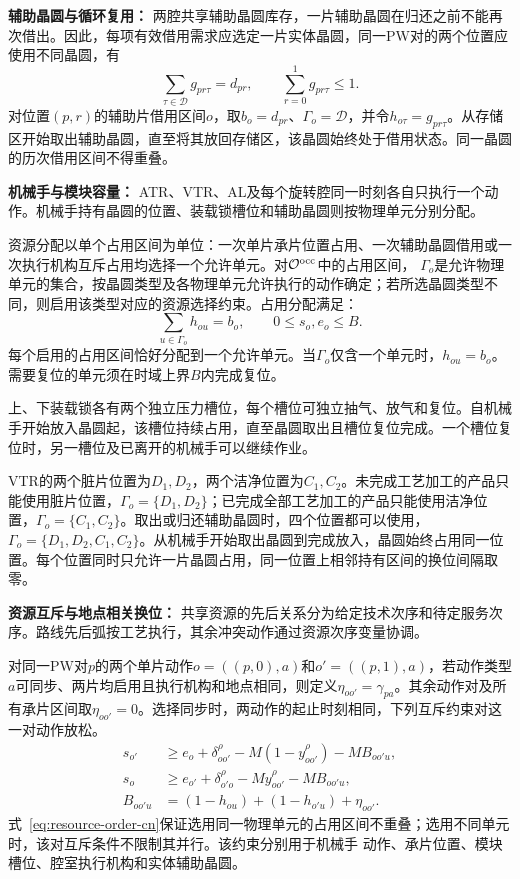 \documentclass[final,5p,times,twocolumn]{elsarticle}
\begin{document}
\noindent\textbf{辅助晶圆与循环复用：}
两腔共享辅助晶圆库存，一片辅助晶圆在归还之前不能再次借出。因此，每项有效借用需求应选定一片实体晶圆，同一PW对的两个位置应使用不同晶圆，有
\begin{equation}
\sum_{\tau\in\mathcal D}g_{pr\tau}=d_{pr},\qquad
\sum_{r=0}^{1}g_{pr\tau}\le1.
\label{eq:dummy-assign-cn}
\end{equation}
对位置$(p,r)$的辅助片借用区间$o$，取$b_o=d_{pr}$、$\Gamma_o=\mathcal D$，并令$h_{o\tau}=g_{pr\tau}$。从存储区开始取出辅助晶圆，直至将其放回存储区，该晶圆始终处于借用状态。同一晶圆的历次借用区间不得重叠。

\noindent\textbf{机械手与模块容量：}
ATR、VTR、AL及每个旋转腔同一时刻各自只执行一个动作。机械手持有晶圆的位置、装载锁槽位和辅助晶圆则按物理单元分别分配。

资源分配以单个占用区间为单位：一次单片承片位置占用、一次辅助晶圆借用或一次执行机构互斥占用均选择一个允许单元。对$\mathcal O^{\rm occ}$中的占用区间，
$\Gamma_o$是允许物理单元的集合，按晶圆类型及各物理单元允许执行的动作确定；若所选晶圆类型不同，则启用该类型对应的资源选择约束。占用分配满足：
\begin{equation}
\sum_{u\in\Gamma_o}h_{ou}=b_o,\qquad 0\le s_o,e_o\le B.
\label{eq:slot-select-cn}
\end{equation}
每个启用的占用区间恰好分配到一个允许单元。当$\Gamma_o$仅含一个单元时，$h_{ou}=b_o$。需要复位的单元须在时域上界$B$内完成复位。

上、下装载锁各有两个独立压力槽位，每个槽位可独立抽气、放气和复位。自机械手开始放入晶圆起，该槽位持续占用，直至晶圆取出且槽位复位完成。一个槽位复位时，另一槽位及已离开的机械手可以继续作业。

VTR的两个脏片位置为$D_1,D_2$，两个洁净位置为$C_1,C_2$。未完成工艺加工的产品只能使用脏片位置，$\Gamma_o=\{D_1,D_2\}$；已完成全部工艺加工的产品只能使用洁净位置，$\Gamma_o=\{C_1,C_2\}$。取出或归还辅助晶圆时，四个位置都可以使用，$\Gamma_o=\{D_1,D_2,C_1,C_2\}$。从机械手开始取出晶圆到完成放入，晶圆始终占用同一位置。每个位置同时只允许一片晶圆占用，同一位置上相邻持有区间的换位间隔取零。

\noindent\textbf{资源互斥与地点相关换位：}
共享资源的先后关系分为给定技术次序和待定服务次序。路线先后弧按工艺执行，其余冲突动作通过资源次序变量协调。

对同一PW对$p$的两个单片动作$o=((p,0),a)$和$o'=((p,1),a)$，若动作类型$a$可同步、两片均启用且执行机构和地点相同，则定义$\eta_{oo'}=\gamma_{pa}$。其余动作对及所有承片区间取$\eta_{oo'}=0$。选择同步时，两动作的起止时刻相同，下列互斥约束对这一对动作放松。
\begin{equation}
\begin{aligned}
s_{o'}&\ge e_o+\delta^\rho_{oo'}-M(1-y^\rho_{oo'})-M B_{oo'u},\\
s_o&\ge e_{o'}+\delta^\rho_{o'o}-My^\rho_{oo'}-M B_{oo'u},\\
B_{oo'u}&=(1-h_{ou})+(1-h_{o'u})+\eta_{oo'}.
\end{aligned}
\label{eq:resource-order-cn}
\end{equation}
式~\eqref{eq:resource-order-cn}保证选用同一物理单元的占用区间不重叠；选用不同单元时，该对互斥条件不限制其并行。该约束分别用于机械手
动作、承片位置、模块槽位、腔室执行机构和实体辅助晶圆。
\end{document}
